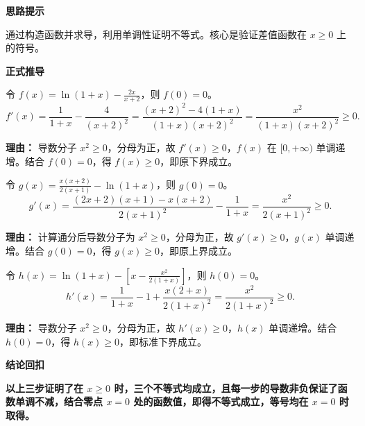 \begin{proofbox}
\textbf{\textcolor{CProof}{思路提示}}

通过构造函数并求导，利用单调性证明不等式。核心是验证差值函数在 $x\geq0$ 上的符号。

\medskip
\textbf{\textcolor{CProof}{正式推导}}
\begin{description}[style=nextline, leftmargin=2.8em, labelsep=0.5em, itemsep=0.55em]
    \item[\textbf{步骤一（证下界 $\frac{2x}{x+2}\leq\ln(1+x)$）：}] 令 $f(x)=\ln(1+x)-\frac{2x}{x+2}$，则 $f(0)=0$。
    \[
    f'(x)=\frac{1}{1+x}-\frac{4}{(x+2)^2}=\frac{(x+2)^2-4(1+x)}{(1+x)(x+2)^2}=\frac{x^2}{(1+x)(x+2)^2}\geq 0.
    \]
    \par\textbf{理由：}
    导数分子 $x^2\geq0$，分母为正，故 $f'(x)\geq0$，$f(x)$ 在 $[0,+\infty)$ 单调递增。结合 $f(0)=0$，得 $f(x)\geq0$，即原下界成立。

    \item[\textbf{步骤二（证上界 $\ln(1+x)\leq\frac{x(x+2)}{2(x+1)}$）：}] 令 $g(x)=\frac{x(x+2)}{2(x+1)}-\ln(1+x)$，则 $g(0)=0$。
    \[
    g'(x)=\frac{(2x+2)(x+1)-x(x+2)}{2(x+1)^2}-\frac{1}{1+x}=\frac{x^2}{2(x+1)^2}\geq 0.
    \]
    \par\textbf{理由：}
    计算通分后导数分子为 $x^2\geq0$，分母为正，故 $g'(x)\geq0$，$g(x)$ 单调递增。结合 $g(0)=0$，得 $g(x)\geq0$，即原上界成立。

    \item[\textbf{步骤三（证标准下界 $\ln(1+x)\geq x-\frac{x^2}{2(1+x)}$）：}] 令 $h(x)=\ln(1+x)-\left[x-\frac{x^2}{2(1+x)}\right]$，则 $h(0)=0$。
    \[
    h'(x)=\frac{1}{1+x}-1+\frac{x(2+x)}{2(1+x)^2}=\frac{x^2}{2(1+x)^2}\geq 0.
    \]
    \par\textbf{理由：}
    导数分子 $x^2\geq0$，分母为正，故 $h'(x)\geq0$，$h(x)$ 单调递增。结合 $h(0)=0$，得 $h(x)\geq0$，即标准下界成立。
\end{description}

\medskip
\textbf{\textcolor{CProof}{结论回扣}}

\textbf{以上三步证明了在 $x\geq0$ 时，三个不等式均成立，且每一步的导数非负保证了函数单调不减，结合零点 $x=0$ 处的函数值，即得不等式成立，等号均在 $x=0$ 时取得。}

\end{proofbox}
